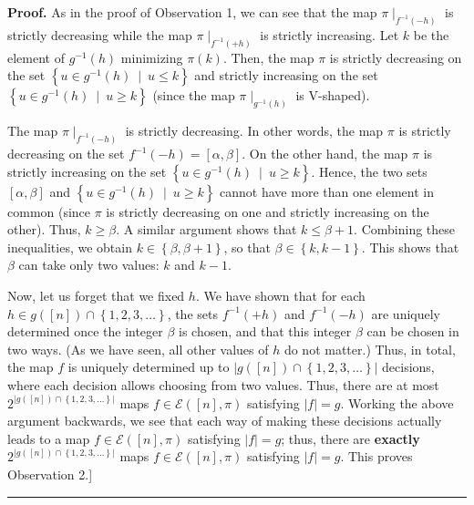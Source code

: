 \documentclass[numbers=enddot,12pt,final,onecolumn,notitlepage]{scrartcl}%
\theoremstyle{definition}
\newenvironment{proof}[1][Proof]{\noindent\textbf{#1.} }{\ \rule{0.5em}{0.5em}}
\newenvironment{vershort}{}{}
\begin{document}
\begin{vershort}
\begin{proof}
As in the proof of Observation 1, we can see that the map $\pi\mid
_{f^{-1}\left(  -h\right)  }$ is strictly decreasing while the map $\pi
\mid_{f^{-1}\left(  +h\right)  }$ is strictly increasing. Let $k$ be the
element of $g^{-1}\left(  h\right)  $ minimizing $\pi\left(  k\right)  $.
Then, the map $\pi$ is strictly decreasing on the set $\left\{  u\in
g^{-1}\left(  h\right)  \ \mid\ u\leq k\right\}  $ and strictly increasing on
the set $\left\{  u\in g^{-1}\left(  h\right)  \ \mid\ u\geq k\right\}  $
(since the map $\pi\mid_{g^{-1}\left(  h\right)  }$ is V-shaped).

The map $\pi\mid_{f^{-1}\left(  -h\right)  }$ is strictly decreasing. In other
words, the map $\pi$ is strictly decreasing on the set $f^{-1}\left(
-h\right)  =\left[  \alpha,\beta\right]  $. On the other hand, the map $\pi$
is strictly increasing on the set $\left\{  u\in g^{-1}\left(  h\right)
\ \mid\ u\geq k\right\}  $. Hence, the two sets $\left[  \alpha,\beta\right]
$ and $\left\{  u\in g^{-1}\left(  h\right)  \ \mid\ u\geq k\right\}  $ cannot
have more than one element in common
(since $\pi$ is strictly decreasing on one
and strictly increasing on the other). Thus, $k\geq\beta$. A similar argument
shows that $k\leq\beta+1$. Combining these inequalities, we obtain
$k\in\left\{  \beta,\beta+1\right\}  $, so that $\beta\in\left\{
k,k-1\right\}  $. This shows that $\beta$ can take only two values: $k$ and
$k-1$.

Now, let us forget that we fixed $h$.
We have shown that for each $h\in g\left(
\left[  n\right]  \right)  \cap\left\{  1,2,3,\ldots\right\}  $, the sets
$f^{-1}\left(  +h\right)  $ and $f^{-1}\left(  -h\right)  $ are uniquely
determined once the integer $\beta$ is chosen, and that this integer $\beta$
can be chosen in two ways. (As we have seen, all other values of $h$ do not
matter.) Thus, in total, the map $f$ is uniquely determined up to $\left\vert
g\left(  \left[  n\right]  \right)  \cap\left\{  1,2,3,\ldots\right\}
\right\vert $ decisions, where each decision allows choosing from two values.
Thus, there are at most $2^{\left\vert g\left(  \left[  n\right]  \right)
\cap\left\{  1,2,3,\ldots\right\}  \right\vert }$ maps $f\in\mathcal{E}\left(
\left[  n\right]  ,\pi\right)  $ satisfying $\left\vert f\right\vert =g$.
Working the above argument backwards, we see that each way of making these
decisions
actually leads to a map $f\in\mathcal{E}\left(  \left[  n\right]  ,\pi\right)
$ satisfying $\left\vert f\right\vert =g$; thus, there are \textbf{exactly}
$2^{\left\vert g\left(  \left[  n\right]  \right)  \cap\left\{  1,2,3,\ldots
\right\}  \right\vert }$ maps $f\in\mathcal{E}\left(  \left[  n\right]
,\pi\right)  $ satisfying $\left\vert f\right\vert =g$. This proves
Observation 2.]
\end{proof}
\end{vershort}
\end{document}
